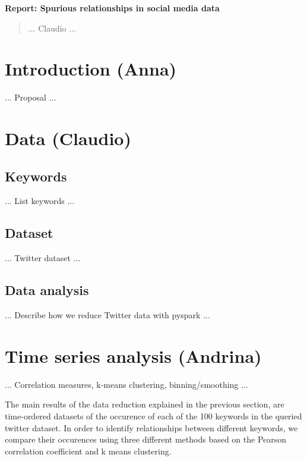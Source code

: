 \documentclass[12pt, a4paper]{article}
\begin{document}
\textbf{Report: Spurious relationships in social media data}

\begin{abstract}
... Claudio ...
\end{abstract}


\vspace{0.2in}

\section{Introduction (Anna)}
... Proposal ...


\section{Data (Claudio)}
\subsection{Keywords}
... List keywords ...

\subsection{Dataset}
... Twitter dataset ...

\subsection{Data analysis}
... Describe how we reduce Twitter data with pyspark ...


\section{Time series analysis (Andrina)}
... Correlation measures, k-means clustering, binning/smoothing ...

The main results of the data reduction explained in the previous section, are time-ordered datasets of the occurence of each of the 100 keywords in the queried twitter dataset. In order to identify relationships between different keywords, we compare their occurences using three different methods based on the Pearson correlation coefficient and k means clustering. 
\end{document}
